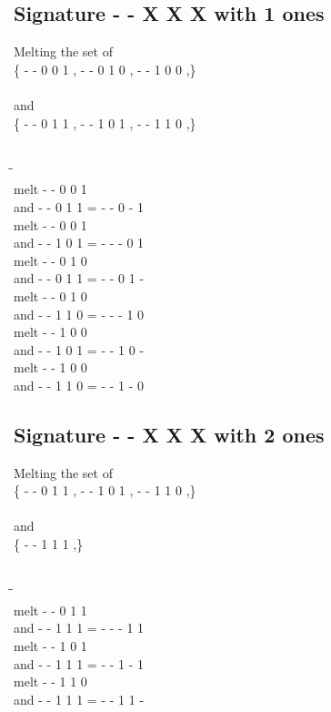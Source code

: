 \documentclass{article}
\begin{document}
\subsection{Signature - - X X X with 1 ones}
Melting the set of\\
\{ -  -  0  0  1 , -  -  0  1  0 , -  -  1  0  0 ,\}\\\\
and\\
\{ -  -  0  1  1 , -  -  1  0  1 , -  -  1  1  0 ,\}\\\\
\begin{tabbing}
\hspace{3cm}\=\hspace{3cm}\=\hspace{3cm}\\[1cm]
melt\> -  -  0  0  1 \\
and\> -  -  0  1  1 \>
 =  -  -  0  -  1 \\[1mm]
melt\> -  -  0  0  1 \\
and\> -  -  1  0  1 \>
 =  -  -  -  0  1 \\[1mm]
melt\> -  -  0  1  0 \\
and\> -  -  0  1  1 \>
 =  -  -  0  1  - \\[1mm]
melt\> -  -  0  1  0 \\
and\> -  -  1  1  0 \>
 =  -  -  -  1  0 \\[1mm]
melt\> -  -  1  0  0 \\
and\> -  -  1  0  1 \>
 =  -  -  1  0  - \\[1mm]
melt\> -  -  1  0  0 \\
and\> -  -  1  1  0 \>
 =  -  -  1  -  0 \\[1mm]
\end{tabbing}
\newpage
\subsection{Signature - - X X X with 2 ones}
Melting the set of\\
\{ -  -  0  1  1 , -  -  1  0  1 , -  -  1  1  0 ,\}\\\\
and\\
\{ -  -  1  1  1 ,\}\\\\
\begin{tabbing}
\hspace{3cm}\=\hspace{3cm}\=\hspace{3cm}\\[1cm]
melt\> -  -  0  1  1 \\
and\> -  -  1  1  1 \>
 =  -  -  -  1  1 \\[1mm]
melt\> -  -  1  0  1 \\
and\> -  -  1  1  1 \>
 =  -  -  1  -  1 \\[1mm]
melt\> -  -  1  1  0 \\
and\> -  -  1  1  1 \>
 =  -  -  1  1  - \\[1mm]
\end{tabbing}
\newpage
\end{document}
